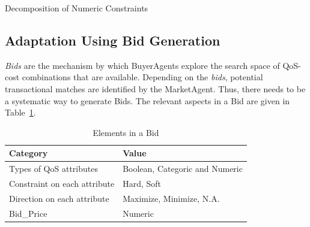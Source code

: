 \documentclass[10pt,journal,compsoc]{IEEEtran}
\begin{document}
\begin{algorithm}
 \DontPrintSemicolon
 \caption{Decomposition of Numeric Constraints \label{algo_decomposing_numeric_constraints}}
\end{algorithm}

\subsection{Adaptation Using Bid Generation}\label{bid_generation}

\textit{Bids} are the mechanism by which BuyerAgents explore the search space of QoS-cost combinations that are available. Depending on the \textit{bids}, potential transactional matches are identified by the MarketAgent. Thus, there needs to be a systematic way to generate Bids. The relevant aspects in a Bid are given in Table~\ref{tbl:bid_elements}.

\begin{table}
\centering
\begin{tabular}{p{7cm}p{7cm}}
\toprule
Category & Value \\
\midrule
Types of QoS attributes & Boolean, Categoric  and Numeric \\
Constraint on each attribute & Hard, Soft \\ 
Direction on each attribute & Maximize, Minimize, N.A. \\ 
Bid\_Price & Numeric \\
\bottomrule
\end{tabular}
\caption{Elements in a Bid \label{tbl:bid_elements}}
\end{table}
\end{document}
